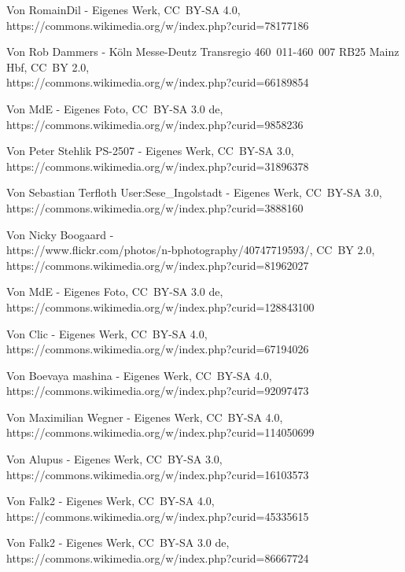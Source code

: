 \item[Desiro HC] Von RomainDil - Eigenes Werk, CC~BY-SA 4.0,\\
  https://commons.wikimedia.org/w/index.php?curid=78177186
\item[Desiro ML] Von Rob Dammers - Köln Messe-Deutz Transregio 460~011-460~007 RB25 Mainz Hbf, CC~BY 2.0,\\
  https://commons.wikimedia.org/w/index.php?curid=66189854
\item[ET0423] Von MdE - Eigenes Foto, CC~BY-SA 3.0 de,\\
   https://commons.wikimedia.org/w/index.php?curid=9858236
\item[ET0430] Von Peter Stehlik PS-2507 - Eigenes Werk, CC~BY-SA 3.0,\\
   https://commons.wikimedia.org/w/index.php?curid=31896378
\item[ICE 2] Von Sebastian Terfloth User:Sese\_Ingolstadt - Eigenes Werk, CC~BY-SA 3.0,\\
  https://commons.wikimedia.org/w/index.php?curid=3888160
\item[ICE 3MS] Von Nicky Boogaard -\\
  https://www.flickr.com/photos/n-bphotography/40747719593/, CC~BY 2.0,\\
  https://commons.wikimedia.org/w/index.php?curid=81962027
\item[iLINT 54] Von MdE - Eigenes Foto, CC~BY-SA 3.0 de,\\
  https://commons.wikimedia.org/w/index.php?curid=128843100
\item[KISS 160] Von Clic - Eigenes Werk, CC~BY-SA 4.0,\\
   https://commons.wikimedia.org/w/index.php?curid=67194026
\item[KISS 200] Von Boevaya mashina - Eigenes Werk, CC~BY-SA 4.0,\\
   https://commons.wikimedia.org/w/index.php?curid=92097473
\item[Mireo] Von Maximilian Wegner - Eigenes Werk, CC~BY-SA 4.0,
  https://commons.wikimedia.org/w/index.php?curid=114050699
\item[RegioSprinter] Von Alupus - Eigenes Werk, CC~BY-SA 3.0,\\
  https://commons.wikimedia.org/w/index.php?curid=16103573
\item[TALENT 2] Von Falk2 - Eigenes Werk, CC~BY-SA 4.0,\\
  https://commons.wikimedia.org/w/index.php?curid=45335615
\item[TwinDexx Vario] Von Falk2 - Eigenes Werk, CC~BY-SA 3.0 de,\\
   https://commons.wikimedia.org/w/index.php?curid=86667724
